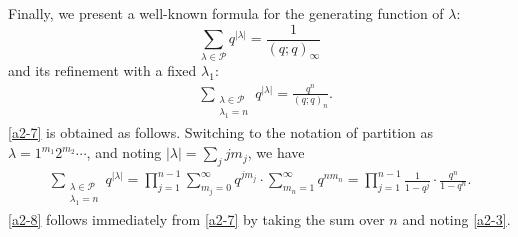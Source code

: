 \documentclass[pdftex]{sigma}
\numberwithin{equation}{section}
\def\i{\infty}
\def\l{\lambda}
\def\Pe{\mathcal{P}}
\begin{document}
Finally, we present a well-known formula for the generating function of $\lambda$:
\begin{equation}
 \label{a2-8}
 \sum_{\l\in\Pe}
 q^{|\l|}=\frac{1}{(q;q)_\i}
\end{equation}
and its refinement with a fixed $\lambda_1$:
\begin{align}
\label{a2-7}
 &\sum_{\substack{\l\in\Pe\\ \l_1=n}}
 q^{|\l|}=\frac{q^n}{(q;q)_n}.
\end{align}
 \eqref{a2-7} is obtained as follows. Switching to the notation of partition as $\l=1^{m_1}2^{m_2}\cdots$,
 and noting $|\l|=\sum_{j}jm_j$, we have
\begin{align*}
 \sum_{\substack{\l\in\Pe\\ \l_1=n}}
 q^{|\l|}
 =
 \prod_{j=1}^{n-1}\sum_{m_j=0}^{\i}
 q^{jm_j}\cdot \sum_{m_n=1}^{\i}q^{n m_n}=\prod_{j=1}^{n-1}\frac{1}{1-q^j}
 \cdot\frac{q^n}{1-q^n}.
\end{align*}
\eqref{a2-8} follows immediately from \eqref{a2-7} by taking the sum over $n$ and noting \eqref{a2-3}.
\end{document}
